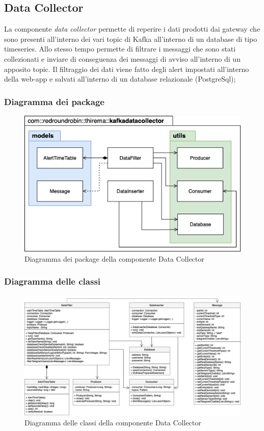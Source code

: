 \subsection{Data Collector}
La componente \textit{data collector} permette di reperire i dati prodotti dai gateway che sono presenti all'interno dei vari topic di Kafka all'interno di un database di tipo timeseries. Allo stesso tempo permette di filtrare i messaggi che sono stati collezionati e inviare di conseguenza dei messaggi di avviso all'interno di un apposito topic.
Il filtraggio dei dati viene fatto degli alert impostati all'interno della web-app e salvati all'interno di un database relazionale (PostgreSql);
	\subsubsection{Diagramma dei package}%
	\begin{figure}[H]
			\centering
			\includegraphics[scale=0.600]{res/images/DATACOLLECTOR/Packagekafkadatacollector.png}
			\caption{Diagramma dei package della componente Data Collector}
		\end{figure}
	\begin{landscape}
	\subsubsection{Diagramma delle classi}%
		\begin{figure}[H]
			\centering
			\includegraphics[scale=0.550]{res/images/DATACOLLECTOR/ClassikafkaDataCollector.png}
			\caption{Diagramma delle classi della componente Data Collector}
		\end{figure}
	\end{landscape}
